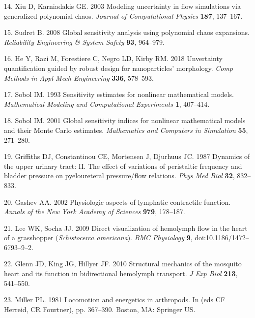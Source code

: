 \documentclass[
]{article}
\begin{document}
\leavevmode\hypertarget{ref-XiuK2003}{}%
14. Xiu D, Karniadakis GE. 2003 Modeling uncertainty in flow simulations
via generalized polynomial chaos. \emph{Journal of Computational
Physics} \textbf{187}, 137--167.

\leavevmode\hypertarget{ref-Sudret:2008}{}%
15. Sudret B. 2008 Global sensitivity analysis using polynomial chaos
expansions. \emph{Reliability Engineering \& System Safety} \textbf{93},
964--979.

\leavevmode\hypertarget{ref-He:2018}{}%
16. He Y, Razi M, Forestiere C, Negro LD, Kirby RM. 2018 Unvertainty
quantification guided by robust design for nanoparticles' morphology.
\emph{Comp Methods in Appl Mech Engineering} \textbf{336}, 578--593.

\leavevmode\hypertarget{ref-Sobol:1993}{}%
17. Sobol IM. 1993 Sensitivity estimates for nonlinear mathematical
models. \emph{Mathematical Modeling and Computational Experiments}
\textbf{1}, 407--414.

\leavevmode\hypertarget{ref-Sobol:2001}{}%
18. Sobol IM. 2001 Global sensitivity indices for nonlinear mathematical
models and their Monte Carlo estimates. \emph{Mathematics and Computers
in Simulation} \textbf{55}, 271--280.

\leavevmode\hypertarget{ref-Griffiths:1987}{}%
19. Griffiths DJ, Constantinou CE, Mortensen J, Djurhuus JC. 1987
Dynamics of the upper urinary tract: II. The effect of variations of
peristaltic frequency and bladder pressure on pyeloureteral
pressure/flow relations. \emph{Phys Med Biol} \textbf{32}, 832--833.

\leavevmode\hypertarget{ref-Gashev:2002}{}%
20. Gashev AA. 2002 Physiologic aspects of lymphatic contractile
function. \emph{Annals of the New York Academy of Sciences}
\textbf{979}, 178--187.

\leavevmode\hypertarget{ref-Lee:2009}{}%
21. Lee WK, Socha JJ. 2009 Direct visualization of hemolymph flow in the
heart of a grasshopper (\emph{Schistocerca americana}). \emph{BMC
Physiology} \textbf{9}, doi:10.1186/1472--6793--9--2.

\leavevmode\hypertarget{ref-Glenn:2010}{}%
22. Glenn JD, King JG, Hillyer JF. 2010 Structural mechanics of the
mosquito heart and its function in bidirectional hemolymph transport.
\emph{J Exp Biol} \textbf{213}, 541--550.

\leavevmode\hypertarget{ref-Miller:1981}{}%
23. Miller PL. 1981 Locomotion and energetics in arthropods. In (eds CF
Herreid, CR Fourtner), pp. 367--390. Boston, MA: Springer US.
\end{document}
